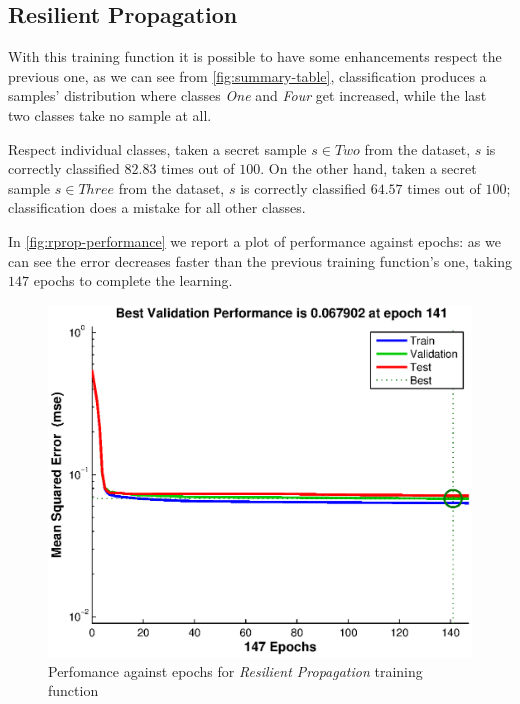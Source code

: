 \documentclass[10pt,a4paper]{article}
\begin{document}
    \subsection{Resilient Propagation}

    With this training function it is possible to have some enhancements respect the previous one, 
    as we can see from \autoref{fig:summary-table}, classification produces a samples' distribution
    where classes \emph{One} and \emph{Four} get increased, while the last two classes take no sample at all.

    Respect individual classes, taken a secret sample $s \in Two$ from the dataset, $s$ is correctly classified $82.83$ times out of $100$. 
    On the other hand, taken a secret sample $s \in Three$ from the dataset, $s$ is correctly classified $64.57$ times out of $100$;
    classification does a mistake for all other classes.

    In \autoref{fig:rprop-performance} we report a plot of performance against epochs: as we can
    see the error decreases faster than the previous training function's one, taking $147$ epochs to complete the learning.

    \begin{figure}
    \centering
    \includegraphics[scale=0.7]{eps/rprop-performance.eps}
    \caption{Perfomance against epochs for \emph{Resilient Propagation} training function}
    \label{fig:rprop-performance}
    \end{figure}
\end{document}
